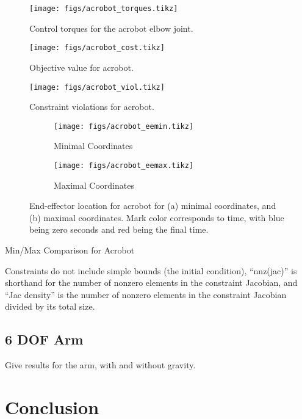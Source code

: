 \documentclass[conference]{IEEEtran}
\begin{document}
\begin{figure}
    \centering
    \texttt{[image: figs/acrobot\_torques.tikz]}
    \caption{Control torques for the acrobot elbow joint.}
    \label{fig:acrobot_torques}
\end{figure}
\begin{figure}
    \centering
    \texttt{[image: figs/acrobot\_cost.tikz]}
    \caption{Objective value for acrobot.}
    \label{fig:acrobot_cost}
\end{figure}
\begin{figure}
    \centering
    \texttt{[image: figs/acrobot\_viol.tikz]}
    \caption{Constraint violations for acrobot.}
    \label{fig:acrobot_viol}
\end{figure}
\begin{figure}
    \centering
    \begin{subfigure}{0.9\columnwidth}
        \texttt{[image: figs/acrobot\_eemin.tikz]}
        \caption{Minimal Coordinates}
        \label{fig:acrobot_eemin}
    \end{subfigure}
    \begin{subfigure}{0.9\columnwidth}
        \texttt{[image: figs/acrobot\_eemax.tikz]}
        \caption{Maximal Coordinates}
        \label{fig:acrobot_eemax}
    \end{subfigure}
    \caption{End-effector location for acrobot for (a) minimal 
        coordinates, and (b) maximal coordinates. Mark color 
        corresponds to time, with blue being zero seconds and red being the final time.
    }
\end{figure}

\begin{table}
    \centering 
    \caption{Min/Max Comparison for Acrobot}
    
    \caption*{ \small
        Constraints do not include simple bounds (the initial condition), ``nnz(jac)'' 
        is shorthand for the number of nonzero elements in the constraint Jacobian, and 
        ``Jac density'' is the number of nonzero elements in the constraint Jacobian 
        divided by its total size.
    }
\end{table}


\subsection{6 DOF Arm}
Give results for the arm, with and without gravity. 

\section{Conclusion}

\printbibliography
\end{document}
